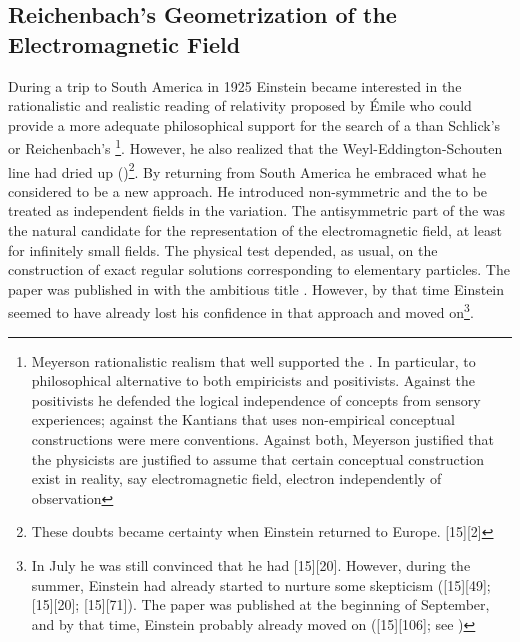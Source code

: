 \documentclass[draft]{article}
\begin{document}
\subsection{Reichenbach's Geometrization of the Electromagnetic Field}
%
During a trip to South America in 1925 Einstein became interested in the rationalistic and realistic reading of relativity proposed by \'Emile   who could provide a more adequate philosophical support for the search of a \uft than Schlick's or Reichenbach's \footnote{Meyerson rationalistic realism that well supported the \uftp. In particular, to philosophical alternative to both empiricists and positivists. Against the positivists he defended the logical independence of concepts from sensory experiences; against the Kantians that uses non-empirical  conceptual constructions were mere conventions. Against both, Meyerson justified that the physicists are justified to assume that certain conceptual construction exist in reality, say electromagnetic field, electron independently of observation}. However, he also realized that the Weyl-Eddington-Schouten line had dried up ()\footnote{These doubts became certainty when Einstein returned to Europe.  [15][2]}. By returning from South America he embraced what he considered to be a new approach. He introduced non-symmetric \Gtmn and the \gmn to be treated as independent fields in the variation. The antisymmetric part of the \gmn was the natural candidate for the representation of the electromagnetic field, at least for infinitely small fields. The physical test depended, as usual, on the construction of exact regular solutions corresponding to elementary particles. The paper was published in  with the ambitious title   \citep{Einstein1925}. However, by that time Einstein seemed to have already lost his confidence in that approach and moved on\footnote{In July he was still convinced that he had  [15][20]. However, during the summer, Einstein had already started to nurture some skepticism ([15][49]; [15][20]; [15][71]). The paper was published at the beginning of September, and by that time, Einstein probably already moved on ([15][106]; see \cite{Einstein1927c})}.
\end{document}
